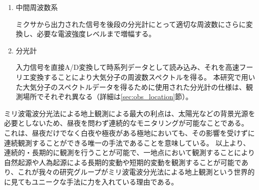 \begin{enumerate}
        \begin{gather}
            T_{\mathrm{SSB}} = \left( 1 + \frac{1}{R} \right) T_{\mathrm{DSB}}
            \label{eq:ssb_dsb} \\
            T_{\mathrm{SSB}}:\mathrm{SSB}での電波強度、T_{\mathrm{DSB}}:\mathrm{DSB}での電波強度 \notag
        \end{gather} \par
        本研究では、サイドバンド比は$R\approx 1$と仮定しており、これは分子の輝線スペクトルが片方のサイドバンドのみにある場合、スペクトルが実際の半分の強度で出力されることを意味する。
        そのため、解析の際には、DSBミクサを用いて得られたスペクトル強度については、あらかじめ2倍にしてから行っている（詳細は\ref{sec:derive_columndensity}節）。
    \item 中間周波数系 \par
        ミクサから出力された信号を後段の分光計にとって適切な周波数にさらに変換し、必要な電波強度レベルまで増幅する。
    \item 分光計 \par
        入力信号を直接A/D変換して時系列データとして読み込み、それを高速フーリエ変換することにより大気分子の周波数スペクトルを得る。
        本研究で用いた大気分子のスペクトルデータを得るために使用された分光計の仕様は、観測場所でそれぞれ異なる（詳細は\ref{sec:obs_location}節）。
\end{enumerate} \par
ミリ波電波分光法による地上観測による最大の利点は、太陽光などの背景光源を必要としないため、昼夜を問わず連続的なモニタリングが可能なことである。
これは、昼夜だけでなく白夜や極夜がある極地においても、その影響を受けずに連続観測することができる唯一の手法であることを意味している。
以上より、連続的・長期的に観測を行うことが可能で、一地点において観測することにより自然起源や人為起源による長期的変動や短期的変動を観測することが可能であり、これが我々の研究グループがミリ波電波分光法による地上観測という世界的に見てもユニークな手法に力を入れている理由である。


